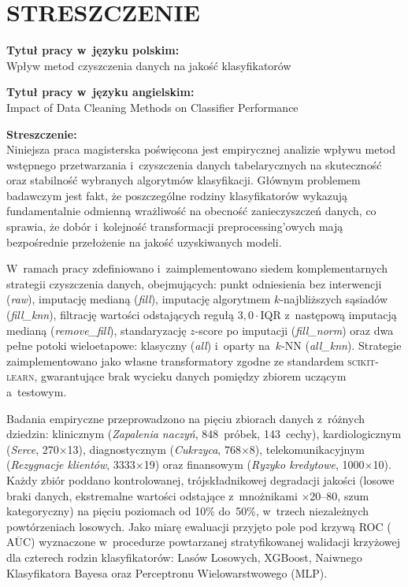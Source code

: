 \chapter*{STRESZCZENIE}

\noindent \textbf{Tytuł pracy w~języku polskim:}\\
Wpływ metod czyszczenia danych na jakość klasyfikatorów

\vspace{0.4cm}
\noindent \textbf{Tytuł pracy w~języku angielskim:}\\
Impact of Data Cleaning Methods on Classifier Performance

\vspace{0.4cm}
\noindent \textbf{Streszczenie:}\\
Niniejsza praca magisterska poświęcona jest empirycznej analizie wpływu metod wstępnego przetwarzania i~czyszczenia danych tabelarycznych na skuteczność oraz stabilność wybranych algorytmów klasyfikacji. Głównym problemem badawczym jest fakt, że poszczególne rodziny klasyfikatorów wykazują fundamentalnie odmienną wrażliwość na obecność zanieczyszczeń danych, co sprawia, że dobór i~kolejność transformacji preprocessing'owych mają bezpośrednie przełożenie na jakość uzyskiwanych modeli.

W~ramach pracy zdefiniowano i~zaimplementowano siedem komplementarnych strategii czyszczenia danych, obejmujących: punkt odniesienia bez interwencji (\textit{raw}), imputację medianą (\textit{fill}), imputację algorytmem $k$-najbliższych sąsiadów (\textit{fill\_knn}), filtrację wartości odstających regułą $3{,}0 \cdot \mathrm{IQR}$ z~następową imputacją medianą (\textit{remove\_fill}), standaryzację $z$-score po imputacji (\textit{fill\_norm}) oraz dwa pełne potoki wieloetapowe: klasyczny (\textit{all}) i~oparty na~$k$-NN (\textit{all\_knn}). Strategie zaimplementowano jako własne transformatory zgodne ze standardem \textsc{scikit-learn}, gwarantujące brak wycieku danych pomiędzy zbiorem uczącym a~testowym.

Badania empiryczne przeprowadzono na pięciu zbiorach danych z~różnych dziedzin: klinicznym (\textit{Zapalenia naczyń}, 848~próbek, 143~cechy), kardiologicznym (\textit{Serce}, 270$\times$13), diagnostycznym (\textit{Cukrzyca}, 768$\times$8), telekomunikacyjnym (\textit{Rezygnacje klientów}, 3333$\times$19) oraz finansowym (\textit{Ryzyko kredytowe}, 1000$\times$10). Każdy zbiór poddano kontrolowanej, trójskładnikowej degradacji jakości (losowe braki danych, ekstremalne wartości odstające z~mnożnikami $\times$20--80, szum kategoryczny) na pięciu poziomach od 10\% do~50\%, w~trzech niezależnych powtórzeniach losowych. Jako miarę ewaluacji przyjęto pole pod krzywą ROC ($\overline{\mathrm{AUC}}$) wyznaczone w~procedurze powtarzanej stratyfikowanej walidacji krzyżowej dla czterech rodzin klasyfikatorów: Lasów Losowych, XGBoost, Naiwnego Klasyfikatora Bayesa oraz Perceptronu Wielowarstwowego (MLP).

